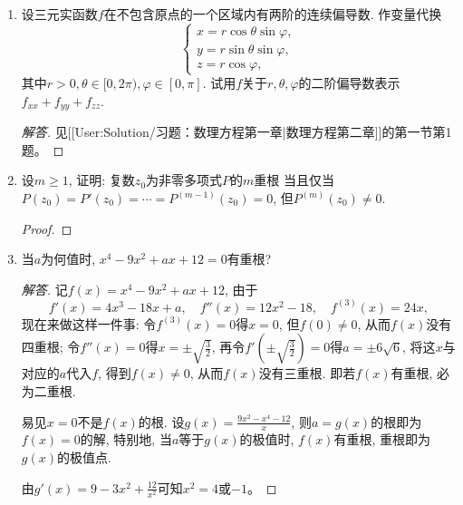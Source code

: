 \begin{3a}
\begin{enumerate}
\begin{proof}[解答]
\[\begin{aligned}
\end{aligned}\]进一步得到\[\frac{\partial^2f}{\partial x^2}+\frac{\partial^2f}{\partial y^2}=\frac{\partial f^2}{\partial r^2}\left(\frac{x^2}{r^2}+\frac{y^2}{r^2}\right)+\frac{\partial f}{\partial r}\left(\frac{x^2}{r^3}+\frac{y^2}{r^3}\right)+\frac{\partial^2 f}{\partial\theta^2}\left(\frac{x^2}{r^4}+\frac{y^2}{r^4}\right),\]
利用\(r^2=x^2+y^2\), 我们便得
\[f_{xx}+f_{yy}=\frac{\partial^2f}{\partial x^2}+\frac{\partial^2f}{\partial y^2}
=\frac{\partial^2f}{\partial r^2}+\frac{1}{r}\frac{\partial f}{\partial r}
+\frac{1}{r^2}\frac{\partial^2f}{\partial\theta^2}.\qedhere\]
\end{proof}
\item 设三元实函数\(f\)在不包含原点的一个区域内有两阶的连续偏导数. 
作变量代换\[\begin{cases}
    x=r\cos\theta\sin\varphi,\\
    y=r\sin\theta\sin\varphi,\\
    z=r\cos\varphi,
\end{cases}\]其中\(r>0,\theta\in[0,2\pi),\varphi\in[0,\pi]\). 
试用\(f\)关于\(r,\theta,\varphi\)的二阶偏导数表示\(f_{xx}+f_{yy}+f_{zz}\).
\begin{proof}[解答]
见[[User:Solution/\qquad 习题：数理方程第一章|数理方程第二章]]的第一节第1题。
\end{proof}
\item 设\(m\geqslant1\), 证明: 复数\(z_0\)为非零多项式\(P\)的\(m\)重根
当且仅当\(P(z_0)=P'(z_0)=\cdots=P^{(m-1)}(z_0)=0\), 但\(P^{(m)}(z_0)\ne 0\).
\begin{proof}

\end{proof}
\item 当\(a\)为何值时, \(x^4-9x^2+ax+12=0\)有重根?
\begin{proof}[解答]
记\(f(x)=x^4-9x^2+ax+12\), 由于\[f'(x)=4x^3-18x+a,\quad f''(x)=12x^2-18,\quad f^{(3)}(x)=24x,\]
现在来做这样一件事: 令\(f^{(3)}(x)=0\)得\(x=0\), 但\(f(0)\ne 0\), 从而\(f(x)\)没有四重根; 
令\(f''(x)=0\)得\(x=\pm\sqrt{\frac{3}{2}}\), 再令\(f'\left(\pm\sqrt{\frac{3}{2}}\right)=0\)得\(a=\pm 6\sqrt{6}\), 将这\(x\)与对应的\(a\)代入\(f\), 得到\(f(x)\ne 0\), 从而\(f(x)\)没有三重根. 即若\(f(x)\)有重根, 必为二重根.

易见\(x=0\)不是\(f(x)\)的根. 设\(g(x)=\frac{9x^2-x^4-12}{x}\), 则\(a=g(x)\)的根即为\(f(x)=0\)的解, 特别地, 当\(a\)等于\(g(x)\)的极值时, \(f(x)\)有重根, 重根即为\(g(x)\)的极值点.

由\(g'(x)=9-3x^2+\frac{12}{x^2}\)可知$x^2=4$或$-1$。


\end{proof}
\end{enumerate}
\end{3a}
